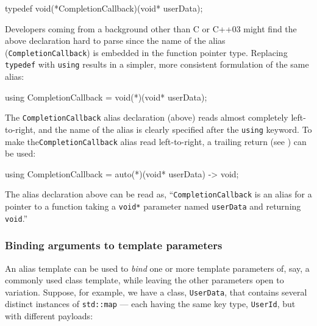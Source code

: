 \begin{emcppslisting}[language=C++]
typedef void(*CompletionCallback)(void* userData);
\end{emcppslisting}

\noindent Developers coming from a background other than C or C++03 might find the
above declaration hard to parse since the name of the alias
(\lstinline!CompletionCallback!) is embedded in the function pointer type.
Replacing \lstinline!typedef! with \lstinline!using! results in a simpler,
more consistent formulation of the same alias:

\begin{emcppslisting}[language=C++]
using CompletionCallback = void(*)(void* userData);
\end{emcppslisting}

\noindent The \lstinline!CompletionCallback! alias declaration (above) reads almost
completely left-to-right, and the name of the alias is clearly
specified after the \lstinline!using! keyword. To make the\linebreak[4]
\lstinline!CompletionCallback! alias read left-to-right, a
  trailing return (see )
can be used:

  \begin{emcppslisting}[language=C++]
  using CompletionCallback = auto(*)(void* userData) -> void;
  \end{emcppslisting}

\noindent The alias declaration above can be read as,
  ``\lstinline!CompletionCallback! is an alias for a pointer to a
  function taking a \lstinline!void*! parameter named \lstinline!userData! and
  returning \lstinline!void!.''

\subsubsection[Binding arguments to template parameters]{Binding arguments to template parameters}\label{binding-template-arguments}

An alias template can be used to \emph{bind} one or more template
parameters of, say, a commonly used class template, while leaving the
other parameters open to variation. Suppose, for example, we have a class, \lstinline!UserData!, that contains
several distinct instances of \lstinline!std::map! --- each
having the same key type, \lstinline!UserId!, but with different payloads:

